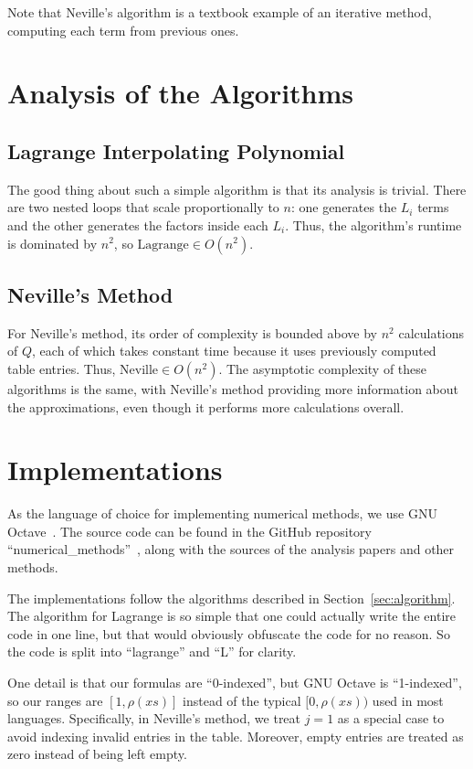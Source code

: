 \documentclass[12pt]{article}
\theoremstyle{plain}
\theoremstyle{remark}
\begin{document}
Note that Neville's algorithm is a textbook example of an iterative method, computing each term from previous ones.

\section{Analysis of the Algorithms}\label{sec:analysis}

\subsection{Lagrange Interpolating Polynomial}

The good thing about such a simple algorithm is that its analysis is trivial. There are two nested loops that scale proportionally to $n$: one generates the $L_i$ terms and the other generates the factors inside each $L_i$. Thus, the algorithm's runtime is dominated by $n^2$, so $\text{Lagrange} \in O(n^2)$.

\subsection{Neville's Method}

For Neville's method, its order of complexity is bounded above by $n^2$ calculations of $Q$, each of which takes constant time because it uses previously computed table entries. Thus, $\text{Neville} \in O(n^2)$. The asymptotic complexity of these algorithms is the same, with Neville's method providing more information about the approximations, even though it performs more calculations overall.

\section{Implementations}\label{sec:implementation}

As the language of choice for implementing numerical methods, we use GNU Octave~\cite{octave}. The source code can be found in the GitHub repository ``numerical\_methods''~\cite{repo}, along with the sources of the analysis papers and other methods.

The implementations follow the algorithms described in Section~\ref{sec:algorithm}. The algorithm for Lagrange is so simple that one could actually write the entire code in one line, but that would obviously obfuscate the code for no reason. So the code is split into ``lagrange'' and ``L'' for clarity.

One detail is that our formulas are ``0-indexed'', but GNU Octave is ``1-indexed'', so our ranges are $[1, \rho(xs)]$ instead of the typical $[0, \rho(xs))$ used in most languages. Specifically, in Neville's method, we treat $j = 1$ as a special case to avoid indexing invalid entries in the table. Moreover, empty entries are treated as zero instead of being left empty.
\end{document}
